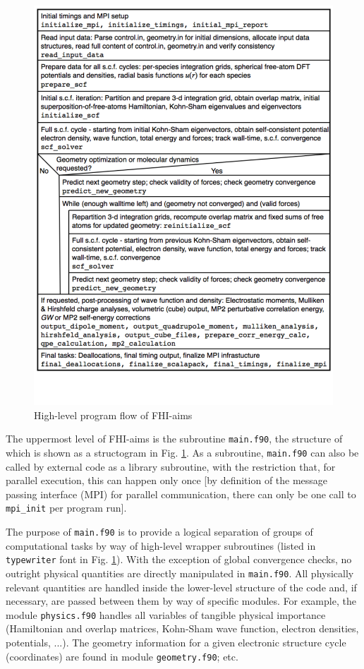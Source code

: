 \begin{figure}
\begin{center}
\includegraphics[height=0.9\textheight]{structogram_main}
\end{center}
\caption{High-level program flow of FHI-aims}
\label{Fig:main.f90}
\end{figure}

The uppermost level of FHI-aims is the subroutine \texttt{main.f90},
the structure of which is shown as a structogram in
Fig. \ref{Fig:main.f90}. As a subroutine, \texttt{main.f90} can also
be called by external code as a library subroutine, with the
restriction that, for parallel execution, this can happen only once
[by definition of the message passing interface (MPI) for parallel
communication, there can only be one call to \texttt{mpi\_init} per
program run]. 

The purpose of \texttt{main.f90} is to provide a logical separation of
groups of computational tasks by way of high-level wrapper subroutines
(listed in \texttt{typewriter} font in Fig. \ref{Fig:main.f90}). With
the exception of global convergence checks, no outright physical
quantities are directly manipulated in \texttt{main.f90}. All
physically relevant quantities are handled inside the lower-level
structure of the code and, if necessary, are passed between them by
way of specific modules. For example, the module \texttt{physics.f90}
handles all variables of tangible physical importance (Hamiltonian and
overlap matrices, Kohn-Sham wave function, electron densities,
potentials, ...). The geometry information for a given electronic
structure cycle (coordinates) are found in module
\texttt{geometry.f90}; etc. 

